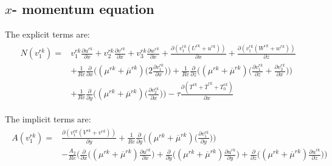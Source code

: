 \documentclass[preprint,12pt]{article}
\begin{document}
\subsection{$x$- momentum equation}
The explicit terms are:
\begin{align}\begin{split}
	N(v_1^{rk})=&v_1^{rk}\frac{\partial u^{rk}}{\partial x}+v_2^{rk}\frac{\partial v^{rk}}{\partial x}+v_3^{rk}\frac{\partial w^{rk}}{\partial x}+\frac{\partial (v_1^{rk}(U^{rk}+u^{rk}))}{\partial x}+\frac{\partial (v_1^{rk}(W^{rk}+w^{rk}))}{\partial z}\\&+\frac{1}{Re}\frac{\partial}{\partial x}\Big(({\mu}^{rk}+\overline{\mu}^{rk})\Big(2\frac{\partial v_1^{rk}}{\partial x}\Big)\Big)+\frac{1}{Re}\frac{\partial}{\partial z}\Big(({\mu}^{rk}+\overline{\mu}^{rk})\Big(\frac{\partial v_1^{rk}}{\partial z}+\frac{\partial v_3^{rk}}{\partial x}\Big)\Big)\\&+\frac{1}{Re}\frac{\partial}{\partial y}\Big(({\mu}^{rk}+\overline{\mu}^{rk})\Big(\frac{\partial v_2^{rk}}{\partial x}\Big)\Big)-\tau\frac{\partial (T^{rk}+\overline{T}^{rk}+T_0^{rk})}{\partial x}
\end{split} \end{align}	

The implicit terms are:
\begin{align}\begin{split}
A(v_1^{rk})=&\frac{\partial (v_1^{rk}(V^{rk}+v^{rk}))}{\partial y}+\frac{1}{Re}\frac{\partial}{\partial y}\Big(({\mu}^{rk}+\overline{\mu}^{rk})\Big(\frac{\partial v_1^{rk}}{\partial y}\Big)\Big)\\&-\frac{A_2}{Re}\Bigg(\frac{\partial}{\partial x}\Big((\mu^{rk}+\overline{\mu}^{rk})\frac{\partial u^{rk}}{\partial x}\Big)+\frac{\partial}{\partial y}\Big((\mu^{rk}+\overline{\mu}^{rk})\frac{\partial u^{rk}}{\partial y}\Big)+\frac{\partial}{\partial z}\Big((\mu^{rk}+\overline{\mu}^{rk})\frac{\partial u^{rk}}{\partial z}\Big)\Bigg)
\end{split} \end{align}	
\end{document}
